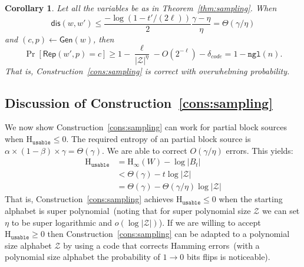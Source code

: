 \documentclass[11pt]{article}
\newcommand{\thref}[1]{\mbox{Theorem~\ref{#1}}}
\newcommand{\consref}[1]{\mbox{Construction~\ref{#1}}}
\newcommand{\class}[1]{{\ensuremath{\mathsf{#1}}}}
\newcommand{\gen}{\ensuremath{\class{Gen}}\xspace}
\newcommand{\rep}{\ensuremath{\class{Rep}}\xspace}
\newcommand{\dis}{\ensuremath{\mathsf{dis}}}
\newcommand{\ngl}{\ensuremath{\mathtt{ngl}}\xspace}
\newcommand{\Hoo}{\mathrm{H}_\infty}
\newcommand{\Huse}{\mathrm{H}_{\mathtt{usable}}}
\newtheorem{corollary}[theorem]{Corollary}
\begin{document}
\begin{corollary}
Let all the variables be as in \thref{thm:sampling}.
When
\[
\dis(w, w')\le \frac{-\log(1-t'/(2\ell))}{2}\frac{\gamma-\eta}{\eta} = \Theta(\gamma/\eta)
\]
and $(c, p)\leftarrow \gen(w)$, then
\[
\Pr[\rep(w', p) = c] \geq 1-\frac{\ell}{|\mathcal{Z}|^\eta} - O(2^{-\ell}) -\delta_{code}= 1-\ngl(n).
\]
That is, \consref{cons:sampling} is correct with overwhelming probability.
\end{corollary}

\subsection{Discussion of \consref{cons:sampling}}
We now show \consref{cons:sampling} can work for partial block sources when $\Huse\le 0$.  The required entropy of  an partial block source is $\alpha\times (1-\beta )\times \gamma = \Theta(\gamma)$.  We are able to correct $O(\gamma/\eta)$ errors.
This yields:
\begin{align*}
\Huse &= \Hoo(W) -\log |B_t| \\
&< \Theta(\gamma)- t \log |\mathcal{Z}|\\
&= \Theta(\gamma) - \Theta(\gamma/\eta) \log |\mathcal{Z}|
\end{align*}
That is, \consref{cons:sampling} achieves $\Huse\le 0$ when the starting alphabet is super polynomial~(noting that for super polynomial size $\mathcal{Z}$ we can set $\eta$ to be super logarithmic and $o(\log |\mathcal{Z}|)$).  If we are willing to accept $\Huse\geq 0$ then \consref{cons:sampling} can be adapted to a polynomial size alphabet $\mathcal{Z}$ by using a code that corrects Hamming errors~(with a polynomial size alphabet the probability of $1\rightarrow 0$ bits flips is noticeable).  %



\appendix
\end{document}
